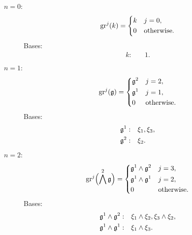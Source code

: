 \begin{description}
  \item[$n=0:$]
        \begin{equation*}
          \operatorname{gr}^{j}(k) =
          \begin{dcases}
            k & j=0, \\
            0 & \text{otherwise.}
          \end{dcases}
        \end{equation*}
        Bases:
        \begin{align*}
          k: \quad & 1.
        \end{align*}

   \item[$n=1:$]
        \begin{equation*}
          \operatorname{gr}^{j}(\mathfrak{g}) =
          \begin{dcases}
            \mathfrak{g}^{2} & j=2, \\
            \mathfrak{g}^{1} & j=1, \\
            0          & \text{otherwise.}
          \end{dcases}
        \end{equation*}
        Bases:
        \begin{align*}
          \mathfrak{g}^{1}: \quad & \xi_{1}, \xi_{3}, \\
          \mathfrak{g}^{2}: \quad & \xi_{2}.
        \end{align*}

   \item[$n=2:$]
        \begin{equation*}
          \operatorname{gr}^{j}\Bigl( \bigwedge^{2}\mathfrak{g} \Bigr) =
          \begin{dcases}
            \mathfrak{g}^{1} \wedge \mathfrak{g}^{2} & j=3, \\
            \mathfrak{g}^{1} \wedge \mathfrak{g}^{1} & j=2, \\
            0                             & \text{otherwise.}
          \end{dcases}
        \end{equation*}
        Bases:
        \begin{align*}
          \mathfrak{g}^{1} \wedge \mathfrak{g}^{2}: \quad & \xi_{1} \wedge \xi_{2}, \xi_{3} \wedge \xi_{2}, \\
          \mathfrak{g}^{1} \wedge \mathfrak{g}^{1}: \quad & \xi_{1} \wedge \xi_{3}.
        \end{align*}


\end{description}
